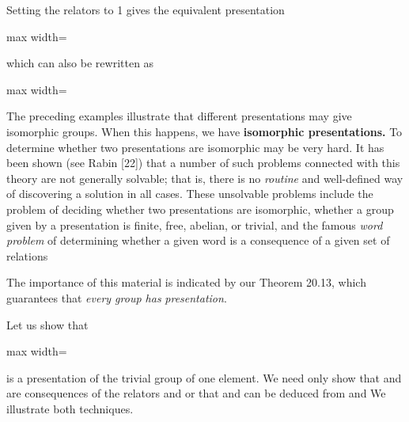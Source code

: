 \documentclass[11pt,oneside]{article}
\begin{document}
\begin{BookBody}

\noindent Setting the relators to 1 gives the equivalent presentation

\begin{center}\begin{adjustbox}{max width=\linewidth}\end{adjustbox}\end{center}

\noindent which can also be rewritten as

\begin{center}\begin{adjustbox}{max width=\linewidth}\end{adjustbox}\end{center} \BookEnd{\blacktriangle}

The preceding examples illustrate that different presentations may give isomorphic groups. When this happens, we have\textbf{ isomorphic presentations.} To determine whether two presentations are isomorphic may be very hard. It has been shown (see Rabin [22]) that a number of such problems connected with this theory are not generally solvable; that is, there is no\textit{ routine} and well-defined way of discovering a solution in all cases. These unsolvable problems include the problem of deciding whether two presentations are isomorphic, whether a group given by a presentation is finite, free, abelian, or trivial, and the famous\textit{ word problem} of determining whether a given word  is a consequence of a given set of relations 

The importance of this material is indicated by our Theorem 20.13, which guarantees that\textit{ every group has}  \textit{presentation}.

 Let us show that

\begin{center}\begin{adjustbox}{max width=\linewidth}\end{adjustbox}\end{center}

\noindent is a presentation of the trivial group of one element. We need only show that  and  are consequences of the relators  and  or that  and  can be deduced from  and  We illustrate both techniques.


\end{BookBody}
\end{document}
